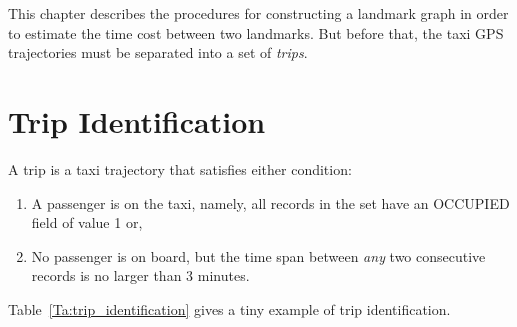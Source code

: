 This chapter describes the procedures for constructing a landmark graph in order to estimate the time cost between two landmarks. But before that, the taxi GPS trajectories must be separated into a set of \emph{trips}.

\section{Trip Identification}
\begin{defn}\label{Def:trip}
A trip is a taxi trajectory that satisfies either condition:
\begin{enumerate}
\item A passenger is on the taxi, namely, all records in the set have an OCCUPIED field of value 1 or, 
\item No passenger is on board, but the time span between \emph{any} two consecutive records is no larger than 3 minutes.
\end{enumerate}
\end{defn}

Table~\ref{Ta:trip_identification} gives a tiny example of trip identification.

\begin{table}[h]
\centering
{}
\caption{An example of trip identification}\label{Ta:trip_identification}
\end{table}

